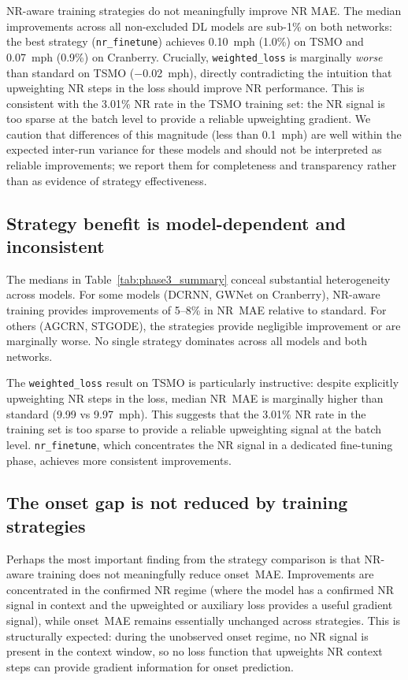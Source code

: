 \documentclass[a4paper]{cas-sc}
\begin{document}
NR-aware training strategies do not meaningfully improve NR MAE.
The median improvements across all non-excluded DL models are
sub-1\% on both networks: the best strategy (\texttt{nr\_finetune})
achieves 0.10~mph (1.0\%) on TSMO and 0.07~mph (0.9\%) on Cranberry.
Crucially, \texttt{weighted\_loss} is marginally \emph{worse} than
standard on TSMO ($-$0.02~mph), directly contradicting the intuition
that upweighting NR steps in the loss should improve NR performance.
This is consistent with the 3.01\% NR rate in the TSMO training set:
the NR signal is too sparse at the batch level to provide a reliable
upweighting gradient.
We caution that differences of this magnitude (less than 0.1~mph) are
well within the expected inter-run variance for these models and
should not be interpreted as reliable improvements; we report them
for completeness and transparency rather than as evidence of
strategy effectiveness.

\subsection{Strategy benefit is model-dependent and inconsistent}

The medians in Table~\ref{tab:phase3_summary} conceal substantial
heterogeneity across models.
For some models (DCRNN, GWNet on Cranberry), NR-aware training
provides improvements of 5--8\% in NR~MAE relative to standard.
For others (AGCRN, STGODE), the strategies provide negligible
improvement or are marginally worse.
No single strategy dominates across all models and both networks.

The \texttt{weighted\_loss} result on TSMO is particularly instructive:
despite explicitly upweighting NR steps in the loss, median NR~MAE
is marginally higher than standard (9.99 vs 9.97~mph).
This suggests that the 3.01\% NR rate in the training set is too
sparse to provide a reliable upweighting signal at the batch level.
\texttt{nr\_finetune}, which concentrates the NR signal in a
dedicated fine-tuning phase, achieves more consistent improvements.

\subsection{The onset gap is not reduced by training strategies}

Perhaps the most important finding from the strategy comparison is
that NR-aware training does not meaningfully reduce onset~MAE.
Improvements are concentrated in the confirmed NR regime
(where the model has a confirmed NR signal in context and
the upweighted or auxiliary loss provides a useful gradient signal),
while onset~MAE remains essentially unchanged across strategies.
This is structurally expected: during the unobserved onset regime,
no NR signal is present in the context window, so no loss function
that upweights NR context steps can provide gradient information
for onset prediction.
\end{document}
